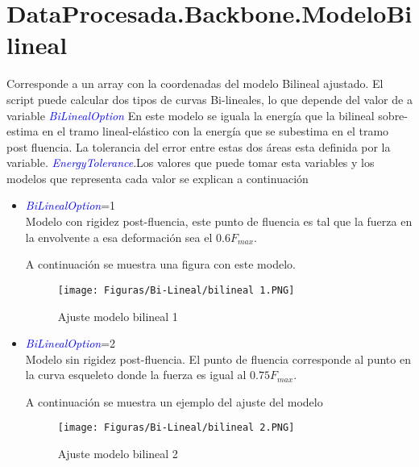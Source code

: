 \documentclass[a4paper, 11pt,article,oneside]{memoir}%
\begin{document}
\section{DataProcesada.Backbone.ModeloBilineal}
Corresponde a un array con la coordenadas del modelo Bilineal ajustado. El script puede calcular dos tipos de curvas Bi-lineales, lo que depende del valor de a variable \textit{\textcolor{blue}{BiLinealOption}}
 En este modelo se iguala la energía que la bilineal sobre-estima en el tramo lineal-elástico con la energía que se subestima en el tramo post fluencia. La tolerancia del error entre estas dos áreas esta definida por la variable. \textit{\textcolor{blue}{EnergyTolerance}}.Los valores que puede tomar esta variables y los modelos que representa cada valor se explican a continuación
\begin{itemize}
    \item  \textit{\textcolor{blue}{BiLinealOption}}=1\\
    Modelo con rigidez post-fluencia, este punto de fluencia es  tal que la fuerza en la envolvente a esa deformación sea el $0.6 F_{max}$.\par A continuación se muestra una figura con este modelo.
     \begin{figure} [H]
    \centering
    \texttt{[image: Figuras/Bi-Lineal/bilineal 1.PNG]}
    \caption{\label{Bi-Lineal 1} Ajuste modelo bilineal 1}
    \end{figure}
    \item  \textit{\textcolor{blue}{BiLinealOption}}=2\\
    Modelo sin rigidez post-fluencia. El punto de fluencia corresponde al punto en la curva esqueleto donde la fuerza es igual al $0.75 F_{max}$. \par 
    A continuación se muestra  un ejemplo del ajuste del modelo 
    \begin{figure} [H]
    \centering
    \texttt{[image: Figuras/Bi-Lineal/bilineal 2.PNG]}
    \caption{\label{Bi-Lineal 2} Ajuste modelo bilineal 2}
    \end{figure}
    
\end{itemize}
\end{document}
